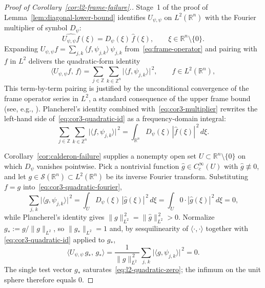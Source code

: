 \documentclass[pdflatex,sn-basic,Numbered]{sn-jnl}
\theoremstyle{thmstyleone}%
\theoremstyle{thmstylethree}%
\begin{document}
\begin{proof}[Proof of Corollary~\ref{cor:l2-frame-failure}.]
	Stage~1 of the proof of Lemma~\ref{lem:diagonal-lower-bound} identifies
	$U_{\psi,\psi}$ on $L^2(\mathbb{R}^n)$ with the Fourier multiplier of
	symbol $D_\psi$:
	\begin{equation}\label{eq:cor3-multiplier}
		\widehat{U_{\psi,\psi} f}(\xi)  =  D_\psi(\xi)\, \widehat{f}(\xi),
		\qquad \xi \in \mathbb{R}^n \setminus \{0\} .
	\end{equation}
	Expanding $U_{\psi,\psi} f = \sum_{j,k} \langle f, \psi_{j,k} \rangle\,
	\psi_{j,k}$ from~\eqref{eq:frame-operator} and pairing with $f$ in
	$L^2$ delivers the quadratic-form identity
	\begin{equation}\label{eq:cor3-quadratic-id}
		\langle U_{\psi,\psi} f,\, f \rangle
		 =  \sum_{j \in \mathbb{Z}} \sum_{k \in \mathbb{Z}^n}
		\bigl| \langle f, \psi_{j,k} \rangle \bigr|^{\,2} ,
		\qquad f \in L^2(\mathbb{R}^n) ,
	\end{equation}		
	This term-by-term pairing is justified by the unconditional convergence of the frame operator series in $L^2$, a standard consequence of the upper frame bound (see, e.g., \cite[Chapter~5]{Christensen2016}). 
	Plancherel's identity combined with~\eqref{eq:cor3-multiplier} rewrites the left-hand side of~\eqref{eq:cor3-quadratic-id} as a frequency-domain integral:
	\begin{equation}\label{eq:cor3-quadratic-fourier}
		\sum_{j \in \mathbb{Z}} \sum_{k \in \mathbb{Z}^n}
		\bigl| \langle f, \psi_{j,k} \rangle \bigr|^{\,2}
		 =  \int_{\mathbb{R}^n} D_\psi(\xi)\, |\widehat{f}(\xi)|^{\,2}\, d\xi .
	\end{equation}
	
	Corollary~\ref{cor:calderon-failure} supplies a nonempty open set
	$U \subset \mathbb{R}^n \setminus \{0\}$ on which $D_\psi$ vanishes
	pointwise. Pick a nontrivial function
	$\widehat{g} \in C^\infty_c(U)$ with $\widehat{g} \not\equiv 0$, and
	let $g \in \mathcal{S}(\mathbb{R}^n) \subset L^2(\mathbb{R}^n)$ be its
	inverse Fourier transform. Substituting $f = g$
	into~\eqref{eq:cor3-quadratic-fourier},
	\begin{equation}\label{eq:cor3-test-vanish}
		\sum_{j,\, k} \bigl| \langle g, \psi_{j,k} \rangle \bigr|^{\,2}
		 =  \int_{U} D_\psi(\xi)\, |\widehat{g}(\xi)|^{\,2} \, d\xi
		 =  \int_{U} 0 \cdot |\widehat{g}(\xi)|^{\,2} \, d\xi
		 =  0 ,
	\end{equation}
	while Plancherel's identity gives
	$\| g \|_{L^2}^{\,2} = \| \widehat{g} \|_{L^2}^{\,2} > 0$. Normalize
	$g_*:=g / \| g \|_{L^2}$, so $\| g_* \|_{L^2} = 1$ and, by
	sesquilinearity of $\langle \cdot, \cdot \rangle$ together with
	\eqref{eq:cor3-quadratic-id} applied to $g_*$,
	\begin{equation*}
		\langle U_{\psi,\psi}\, g_*,\, g_* \rangle
		 =  \frac{1}{\| g \|_{L^2}^{\,2}}
		\sum_{j,\, k} \bigl| \langle g, \psi_{j,k} \rangle \bigr|^{\,2}
		 =  0 .
	\end{equation*}
	The single test vector $g_*$ saturates~\eqref{eq:l2-quadratic-zero};
	the infimum on the unit sphere therefore equals $0$.
	

\end{proof}
\end{document}
